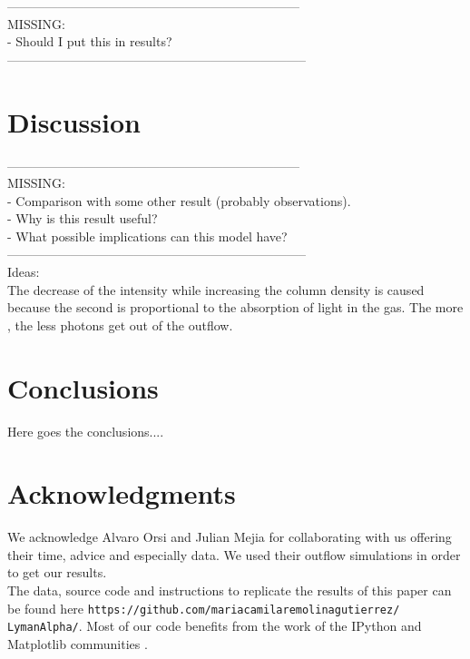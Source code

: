 \documentclass{latex/emulateapj}
\begin{document}
---------------------------------------------------------------------\\
MISSING: \\
- Should I put this in results?
-----------------------------------------------------------------------\\


\section{Discussion}
\label{sec:discussion}

---------------------------------------------------------------------\\
MISSING: \\
- Comparison with some other result (probably observations).\\
- Why is this result useful? \\
- What possible implications can this model have?\\
-----------------------------------------------------------------------\\

Ideas: \\

The decrease of the intensity while increasing the column density is caused because the second is proportional to the absorption of light in the gas. The more \lognh, the less photons get out of the outflow.

\section{Conclusions}
\label{sec:conclusions}
Here goes the conclusions....

\section*{Acknowledgments}

We acknowledge Alvaro Orsi and Julian Mejia for collaborating with us offering their time, advice and especially data. We used their outflow simulations in order to get our results.\\

The data, source code and instructions to replicate the results of this paper can be found here {\texttt{https://github.com/mariacamilaremolinagutierrez/ LymanAlpha/}}.
Most of our code benefits from the work of the IPython and Matplotlib communities \citep{IPython,matplotlib}.\\
\end{document}
